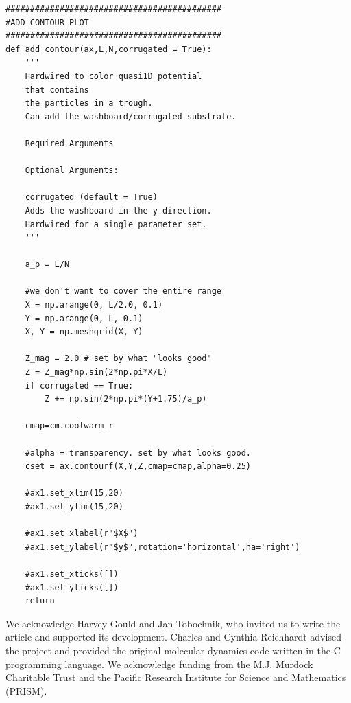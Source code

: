 \documentclass[twocolumn,preprintnumbers,amsmath,amssymb,aps,prx]{revtex4}
\begin{document}
\begin{verbatim}
############################################
#ADD CONTOUR PLOT
############################################
def add_contour(ax,L,N,corrugated = True):
    '''
    Hardwired to color quasi1D potential
    that contains 
    the particles in a trough.  
    Can add the washboard/corrugated substrate.

    Required Arguments

    Optional Arguments:

    corrugated (default = True)  
    Adds the washboard in the y-direction.  
    Hardwired for a single parameter set.    
    '''

    a_p = L/N

    #we don't want to cover the entire range
    X = np.arange(0, L/2.0, 0.1)
    Y = np.arange(0, L, 0.1)
    X, Y = np.meshgrid(X, Y)

    Z_mag = 2.0 # set by what "looks good"
    Z = Z_mag*np.sin(2*np.pi*X/L)
    if corrugated == True:
        Z += np.sin(2*np.pi*(Y+1.75)/a_p) 

    cmap=cm.coolwarm_r

    #alpha = transparency. set by what looks good.
    cset = ax.contourf(X,Y,Z,cmap=cmap,alpha=0.25)

    #ax1.set_xlim(15,20)
    #ax1.set_ylim(15,20)

    #ax1.set_xlabel(r"$X$")
    #ax1.set_ylabel(r"$y$",rotation='horizontal',ha='right')

    #ax1.set_xticks([])
    #ax1.set_yticks([])
    return
\end{verbatim}

\begin{acknowledgments}

  We acknowledge Harvey Gould and Jan Tobochnik,
  who invited us to write the article and
  supported its development.
  Charles and Cynthia Reichhardt advised 
  the project and provided the original molecular dynamics code
  written in the C programming language.
  We acknowledge funding from the M.J. Murdock Charitable Trust
  and the Pacific Research Institute for Science and Mathematics (PRISM).

\end{acknowledgments}
\end{document}
